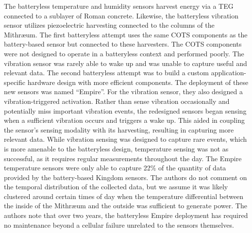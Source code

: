 The batteryless temperature and humidity sensors harvest energy via a TEG connected to a sublayer of Roman concrete.
Likewise, the batteryless vibration sensor utilizes piezoelectric harvesting connected to the columns of the Mithræum.
The first batteryless attempt uses the same COTS components as the battery-based sensor but connected to these harvesters.
The COTS components were not designed to operate in a batteryless context and performed poorly.
The vibration sensor was rarely able to wake up and was unable to capture useful and relevant data.
The second batteryless attempt was to build a custom application-specific hardware design with more efficient
components. The deployment of these new sensors was named ``Empire''.
For the vibration sensor, they also designed a vibration-triggered activation.
Rather than sense vibration occasionally and potentially miss important vibration events, the redesigned sensors began sensing when a sufficient vibration occurs and triggers a wake up.
This aided in coupling the sensor's sensing modality with its harvesting, resulting in capturing more relevant data.
While vibration sensing was designed to capture rare events, which is more amenable to the batteryless design, temperature sensing was not as successful, as it requires regular measurements throughout the day. The Empire temperature sensors were only able to capture 22\% of the quantity of data provided by the battery-based Kingdom sensors.
The authors do not comment on the temporal distribution of the collected data, but we assume it was likely clustered around certain times of day when the temperature differential between the inside of the Mithræum and the outside was sufficient to generate power.
The authors note that over two years, the batteryless Empire deployment has required no maintenance beyond a cellular failure unrelated to the sensors themselves.


